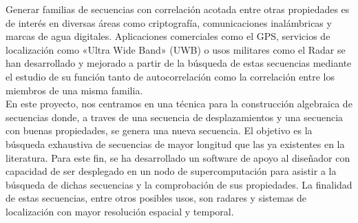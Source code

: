 Generar familias de secuencias con correlación acotada entre otras
propiedades es de interés en diversas áreas como criptografía, comunicaciones
inalámbricas y marcas de agua digitales. Aplicaciones comerciales como el GPS,
servicios de localización como «Ultra Wide Band» (UWB) o usos militares como el
Radar se han desarrollado y mejorado  a partir de la búsqueda de estas
secuencias mediante el estudio de su función tanto de autocorrelación como la
correlación entre los miembros de una misma familia.\\

En este proyecto, nos centramos en una técnica para la
construcción algebraica de secuencias donde, a traves de una secuencia de
desplazamientos y una secuencia con buenas propiedades, se genera una nueva
secuencia. El objetivo es la búsqueda exhaustiva de secuencias de mayor
longitud que las ya existentes en la literatura. Para este fin, se ha
desarrollado un software de apoyo al diseñador con capacidad de ser desplegado
en un nodo de supercomputación para asistir a la búsqueda de dichas secuencias
y la comprobación de sus propiedades. La finalidad de estas secuencias, entre
otros posibles usos, son radares y sistemas de localización con mayor resolución
espacial y temporal.\\
